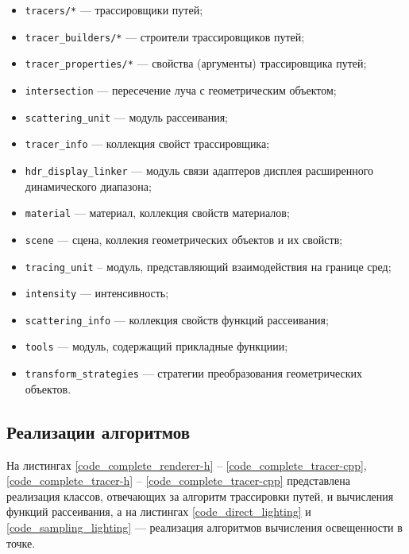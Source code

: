 \begin{itemize}
    \item \verb|tracers/*| --- трассировщики путей;
    \item \verb|tracer_builders/*| --- строители трассировщиков путей;
    \item \verb|tracer_properties/*| --- свойства (аргументы) трассировщика путей;
    \item \verb|intersection| --- пересечение луча с геометрическим объектом;
    \item \verb|scattering_unit| --- модуль рассеивания;
    \item \verb|tracer_info| --- коллекция свойст трассировщика;
    \item \verb|hdr_display_linker| --- модуль связи адаптеров дисплея расширенного динамического диапазона;
    \item \verb|material| --- материал, коллекция свойств материалов;
    \item \verb|scene| --- сцена, коллекия геометрических объектов и их свойств;
    \item \verb|tracing_unit| -- модуль, представляющий  взаимодействия на границе сред;
    \item \verb|intensity| --- интенсивность;
    \item \verb|scattering_info| --- коллекция свойств функций рассеивания;
    \item \verb|tools| --- модуль, содержащий прикладные функциии;
    \item \verb|transform_strategies| --- стратегии преобразования геометрических объектов.
\end{itemize}

\subsection{Реализации алгоритмов}
На листингах \ref{code_complete_renderer-h} -- \ref{code_complete_tracer-cpp},
\ref{code_complete_tracer-h} -- \ref{code_complete_tracer-cpp}
представлена реализация классов, отвечающих за алгоритм трассировки путей, и
вычисления функций рассеивания, а на листингах \ref{code_direct_lighting}
и \ref{code_sampling_lighting} --- реализация алгоритмов вычисления освещенности
в точке.

